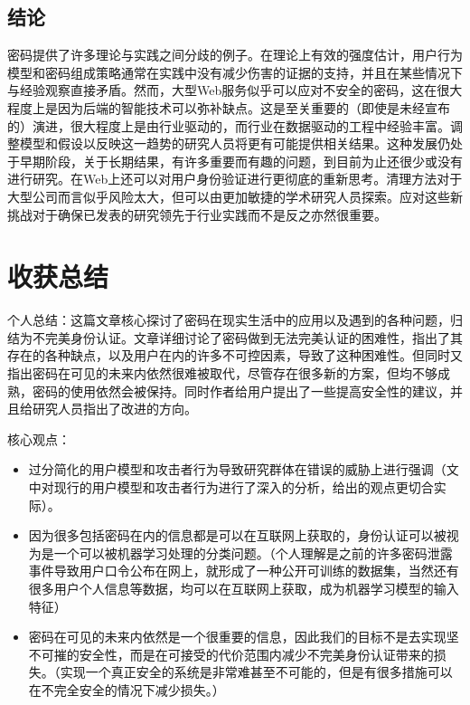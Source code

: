 \subsection{结论}

密码提供了许多理论与实践之间分歧的例子。在理论上有效的强度估计，用户行为模型和密码组成策略通常在实践中没有减少伤害的证据的支持，并且在某些情况下与经验观察直接矛盾。然而，大型Web服务似乎可以应对不安全的密码，这在很大程度上是因为后端的智能技术可以弥补缺点。这是至关重要的（即使是未经宣布的）演进，很大程度上是由行业驱动的，而行业在数据驱动的工程中经验丰富。调整模型和假设以反映这一趋势的研究人员将更有可能提供相关结果。这种发展仍处于早期阶段，关于长期结果，有许多重要而有趣的问题，到目前为止还很少或没有进行研究。在Web上还可以对用户身份验证进行更彻底的重新思考。清理方法对于大型公司而言似乎风险太大，但可以由更加敏捷的学术研究人员探索。应对这些新挑战对于确保已发表的研究领先于行业实践而不是反之亦然很重要。

\section{收获总结}


个人总结：这篇文章\cite{bonneau2015passwords}核心探讨了密码在现实生活中的应用以及遇到的各种问题，归结为不完美身份认证。文章详细讨论了密码做到无法完美认证的困难性，指出了其存在的各种缺点，以及用户在内的许多不可控因素，导致了这种困难性。但同时又指出密码在可见的未来内依然很难被取代，尽管存在很多新的方案，但均不够成熟，密码的使用依然会被保持。同时作者给用户提出了一些提高安全性的建议，并且给研究人员指出了改进的方向。

核心观点：
\begin{itemize}

    \item 过分简化的用户模型和攻击者行为导致研究群体在错误的威胁上进行强调（文中对现行的用户模型和攻击者行为进行了深入的分析，给出的观点更切合实际）。
    \item 因为很多包括密码在内的信息都是可以在互联网上获取的，身份认证可以被视为是一个可以被机器学习处理的分类问题。（个人理解是之前的许多密码泄露事件导致用户口令公布在网上，就形成了一种公开可训练的数据集，当然还有很多用户个人信息等数据，均可以在互联网上获取，成为机器学习模型的输入特征）
    \item  密码在可见的未来内依然是一个很重要的信息，因此我们的目标不是去实现坚不可摧的安全性，而是在可接受的代价范围内减少不完美身份认证带来的损失。（实现一个真正安全的系统是非常难甚至不可能的，但是有很多措施可以在不完全安全的情况下减少损失。）

\end{itemize}


